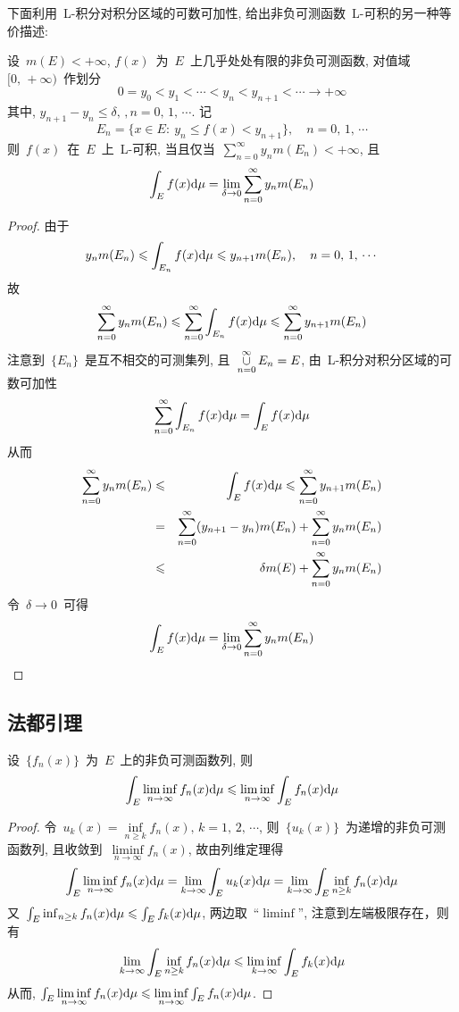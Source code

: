 下面利用~L-积分对积分区域的可数可加性, 给出非负可测函数~L-可积的另一种等价描述:

\begin{theorem}
设~$m(E) < +\infty$, $f(x)$~为~$E$~上几乎处处有限的非负可测函数, 对值域~$[0,\,  +\infty)$~作划分
\[
0 = y_0 < y_1 < \cdots < y_n < y_{n+1} < \cdots \rightarrow +\infty
\]
其中, $y_{n+1} - y_n \leqslant \delta, \,, n = 0,\, 1,\, \cdots$. 记
\[
E_n = \{x \in E: \: y_n \leqslant f(x) < y_{n+1} \},  \quad n = 0,\, 1,\, \cdots
\]
则~$f(x)$~在~$E$~上~L-可积, 当且仅当~$\sum\limits_{n=0}^\infty y_n m(E_n) < +\infty$, 且
\[
\int_E f(x) \mathrm{d} \mu = \lim_{\delta \to 0} \sum_{n=0}^\infty y_n m(E_n)
\]
\end{theorem}

\begin{proof}
由于
\[
y_n m(E_n) \leqslant \int_{E_n} f(x) \mathrm{d} \mu \leqslant y_{n+1} m(E_n),  \quad n = 0,\, 1,\, \cdots
\]
故
\[
\sum_{n=0}^{\infty} y_n m(E_n) \leqslant \sum_{n=0}^{\infty} \int_{E_n} f(x) \mathrm{d} \mu \leqslant \sum_{n=0}^{\infty} y_{n+1} m(E_n)
\]
注意到~$\{E_n\}$~是互不相交的可测集列, 且~$\mathop{\mathop{\cup}}\limits_{n=0}^\infty E_n = E$, 由~L-积分对积分区域的可数可加性
\[
\mathop{\sum}\limits_{n=0}^{\infty} \int_{E_n} f(x) \mathrm{d} \mu = \int_E f(x) \mathrm{d} \mu
\]
从而
\begin{eqnarray*}
\sum_{n=0}^{\infty} y_n m(E_n) &\leqslant& \int_E f(x) \mathrm{d} \mu \leqslant \sum_{n=0}^{\infty} y_{n+1} m(E_n) \\
&=& \sum_{n=0}^{\infty} (y_{n+1}-y_n) m(E_n) + \sum_{n=0}^{\infty} y_n m(E_n) \\
&\leqslant& \delta m(E) + \sum_{n=0}^{\infty} y_n m(E_n)
\end{eqnarray*}
令~$\delta \to 0$~可得
\[
\int_E f(x) \mathrm{d} \mu = \lim_{\delta \to 0} \sum_{n=0}^\infty y_n m(E_n)
\]
\end{proof}

\subsection{法都引理}

\begin{theorem}
设~$\{f_n(x)\}$~为~$E$~上的非负可测函数列, 则
\[
\int_E \liminf_{n \to \infty} f_n(x) \mathrm{d} \mu \leqslant \liminf_{n \to \infty} \int_E f_n(x) \mathrm{d} \mu
\]
\end{theorem}

\begin{proof}
令~$u_k(x) = \inf\limits_{n \geq k} f_n(x),  \,  k = 1,\,  2,\, \cdots$,  则~$\{u_k(x)\}$~为递增的非负可测函数列, 且收敛到~$\liminf\limits_{n \to \infty} f_n(x)$, 故由列维定理得
\[
\int_E \liminf_{n \to \infty} f_n(x) \mathrm{d} \mu = \lim_{k \to \infty} \int_E u_k(x) \mathrm{d} \mu = \lim_{k \to \infty}  \int_E \inf_{n \geq k} f_n(x) \mathrm{d} \mu
\]
又~$\int_E \inf_{n \geq k} f_n(x) \mathrm{d} \mu \leqslant \int_E f_k(x) \mathrm{d} \mu$, 两边取~``$\liminf$'', 注意到左端极限存在，则有
\[
\lim_{k \to \infty}  \int_E \inf_{n \geq k} f_n(x) \mathrm{d} \mu \leqslant \liminf_{k \to \infty} \int_E f_k(x) \mathrm{d} \mu
\]
从而, $\int_E \liminf\limits_{n \to \infty} f_n(x) \mathrm{d} \mu \leqslant \liminf\limits_{n \to \infty} \int_E f_n(x) \mathrm{d} \mu$. 
\end{proof}

